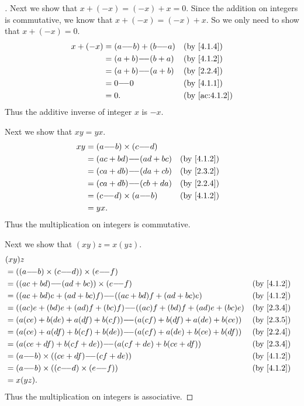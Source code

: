 \begin{proof}[]
  Next we show that \(x + (-x) = (-x) + x = 0\).
  Since the addition on integers is commutative, we know that \(x + (-x) = (-x) + x\).
  So we only need to show that \(x + (-x) = 0\).
  \begin{align*}
    x + (-x) & = (a \mm b) + (b \mm a) &  & \by{4.1.4}    \\
             & = (a + b) \mm (b + a)   &  & \by{4.1.2}    \\
             & = (a + b) \mm (a + b)   &  & \by{2.2.4}    \\
             & = 0 \mm 0               &  & \by{4.1.1}    \\
             & = 0.                    &  & \by{ac:4.1.2}
  \end{align*}
  Thus the additive inverse of integer \(x\) is \(-x\).

  Next we show that \(xy = yx\).
  \begin{align*}
    xy & = (a \mm b) \times (c \mm d)                 \\
       & = (ac + bd) \mm (ad + bc)    &  & \by{4.1.2} \\
       & = (ca + db) \mm (da + cb)    &  & \by{2.3.2} \\
       & = (ca + db) \mm (cb + da)    &  & \by{2.2.4} \\
       & = (c \mm d) \times (a \mm b) &  & \by{4.1.2} \\
       & = yx.
  \end{align*}
  Thus the multiplication on integers is commutative.

  Next we show that \((xy)z = x(yz)\).
  \begin{align*}
     & (xy)z                                                                                 \\
     & = ((a \mm b) \times (c \mm d)) \times (e \mm f)                                       \\
     & = ((ac + bd) \mm (ad + bc)) \times (e \mm f)                          &  & \by{4.1.2} \\
     & = ((ac + bd)e + (ad + bc)f) \mm ((ac + bd)f + (ad + bc)e)             &  & \by{4.1.2} \\
     & = ((ac)e + (bd)e + (ad)f + (bc)f) \mm ((ac)f + (bd)f + (ad)e + (bc)e) &  & \by{2.3.4} \\
     & = (a(ce) + b(de) + a(df) + b(cf)) \mm (a(cf) + b(df) + a(de) + b(ce)) &  & \by{2.3.5} \\
     & = (a(ce) + a(df) + b(cf) + b(de)) \mm (a(cf) + a(de) + b(ce) + b(df)) &  & \by{2.2.4} \\
     & = (a(ce + df) + b(cf + de)) \mm (a(cf + de) + b(ce + df))             &  & \by{2.3.4} \\
     & = (a \mm b) \times ((ce + df) \mm (cf + de))                          &  & \by{4.1.2} \\
     & = (a \mm b) \times ((c \mm d) \times (e \mm f))                       &  & \by{4.1.2} \\
     & = x(yz).
  \end{align*}
  Thus the multiplication on integers is associative.


\end{proof}
